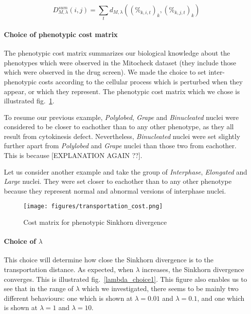 \begin{equation}
D_{M,\lambda}^{sum}(i,j)= \sum_t d_{M,\lambda}((\%_{k,i,t})_{k},(\%_{k,j,t})_{k})
\label{int}
\end{equation}

\paragraph*{Choice of phenotypic cost matrix}
The phenotypic cost matrix summarizes our biological knowledge about the phenotypes which were observed in the Mitocheck dataset (they include those which were observed in the drug screen). We made the choice to set inter-phenotypic costs according to the cellular process which is perturbed when they appear, or which they represent. The phenotypic cost matrix which we chose is illustrated fig.~\ref{cost}.

To resume our previous example, \textit{Polylobed}, \textit{Grape} and \textit{Binucleated} nuclei were considered to be closer to eachother than to any other phenotype, as they all result from cytokinesis defect. Nevertheless, \textit{Binucleated} nuclei were set slightly further apart from \textit{Polylobed} and \textit{Grape} nuclei than those two from eachother. This is because [EXPLANATION AGAIN ??].

Let us consider another example and take the group of \textit{Interphase}, \textit{Elongated} and \textit{Large} nuclei. They were set closer to eachother than to any other phenotype because they represent normal and abnormal versions of interphase nuclei.

\begin{figure*}[ht!]
\centerline{\texttt{[image: figures/transportation\_cost.png]}
}
\caption{Cost matrix for phenotypic Sinkhorn divergence}
\label{cost}
\end{figure*}

\paragraph*{Choice of $\lambda$} This choice will determine how close the Sinkhorn divergence is to the transportation distance. As expected, when $\lambda$ increases, the Sinkhorn divergence converges. This is illustrated fig.~\ref{lambda_choice1}. This figure also enables us to see that in the range of $\lambda$ which we investigated, there seems to be mainly two different behaviours: one which is shown at $\lambda=0.01$ and $\lambda=0.1$, and one which is shown at $\lambda=1$ and $\lambda=10$.

